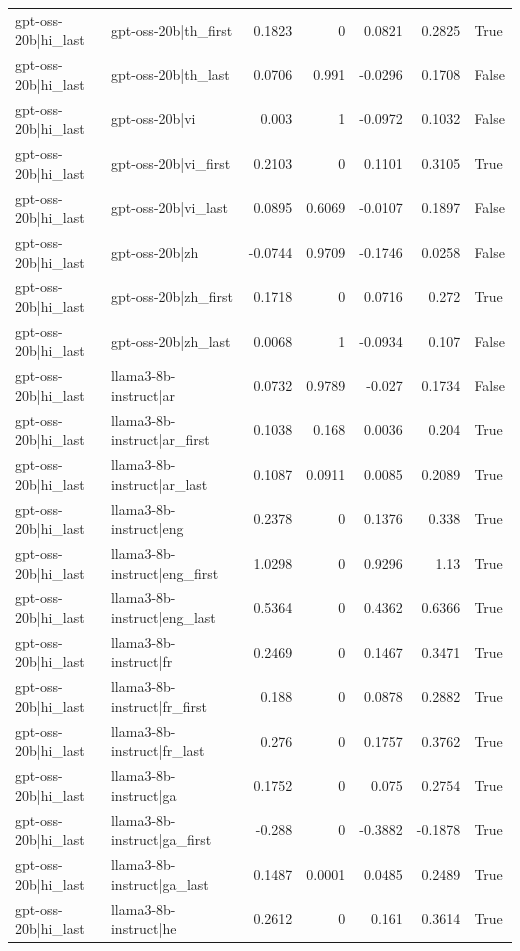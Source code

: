 \begin{table}
\begin{tabular}{l l r r r r l}
gpt-oss-20b|hi_last & gpt-oss-20b|th_first & 0.1823 & 0 & 0.0821 & 0.2825 & True \\
gpt-oss-20b|hi_last & gpt-oss-20b|th_last & 0.0706 & 0.991 & -0.0296 & 0.1708 & False \\
gpt-oss-20b|hi_last & gpt-oss-20b|vi & 0.003 & 1 & -0.0972 & 0.1032 & False \\
gpt-oss-20b|hi_last & gpt-oss-20b|vi_first & 0.2103 & 0 & 0.1101 & 0.3105 & True \\
gpt-oss-20b|hi_last & gpt-oss-20b|vi_last & 0.0895 & 0.6069 & -0.0107 & 0.1897 & False \\
gpt-oss-20b|hi_last & gpt-oss-20b|zh & -0.0744 & 0.9709 & -0.1746 & 0.0258 & False \\
gpt-oss-20b|hi_last & gpt-oss-20b|zh_first & 0.1718 & 0 & 0.0716 & 0.272 & True \\
gpt-oss-20b|hi_last & gpt-oss-20b|zh_last & 0.0068 & 1 & -0.0934 & 0.107 & False \\
gpt-oss-20b|hi_last & llama3-8b-instruct|ar & 0.0732 & 0.9789 & -0.027 & 0.1734 & False \\
gpt-oss-20b|hi_last & llama3-8b-instruct|ar_first & 0.1038 & 0.168 & 0.0036 & 0.204 & True \\
gpt-oss-20b|hi_last & llama3-8b-instruct|ar_last & 0.1087 & 0.0911 & 0.0085 & 0.2089 & True \\
gpt-oss-20b|hi_last & llama3-8b-instruct|eng & 0.2378 & 0 & 0.1376 & 0.338 & True \\
gpt-oss-20b|hi_last & llama3-8b-instruct|eng_first & 1.0298 & 0 & 0.9296 & 1.13 & True \\
gpt-oss-20b|hi_last & llama3-8b-instruct|eng_last & 0.5364 & 0 & 0.4362 & 0.6366 & True \\
gpt-oss-20b|hi_last & llama3-8b-instruct|fr & 0.2469 & 0 & 0.1467 & 0.3471 & True \\
gpt-oss-20b|hi_last & llama3-8b-instruct|fr_first & 0.188 & 0 & 0.0878 & 0.2882 & True \\
gpt-oss-20b|hi_last & llama3-8b-instruct|fr_last & 0.276 & 0 & 0.1757 & 0.3762 & True \\
gpt-oss-20b|hi_last & llama3-8b-instruct|ga & 0.1752 & 0 & 0.075 & 0.2754 & True \\
gpt-oss-20b|hi_last & llama3-8b-instruct|ga_first & -0.288 & 0 & -0.3882 & -0.1878 & True \\
gpt-oss-20b|hi_last & llama3-8b-instruct|ga_last & 0.1487 & 0.0001 & 0.0485 & 0.2489 & True \\
gpt-oss-20b|hi_last & llama3-8b-instruct|he & 0.2612 & 0 & 0.161 & 0.3614 & True \\

\end{tabular}
\end{table}
